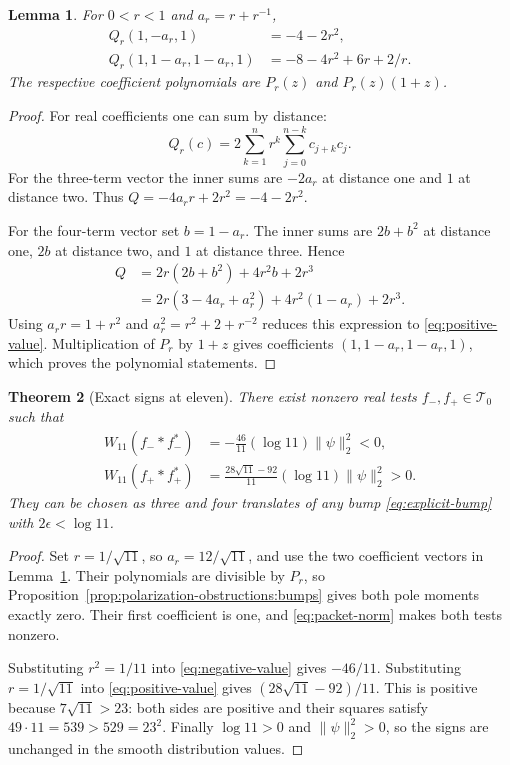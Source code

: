 \documentclass[11pt,letterpaper]{article}
\newtheorem{theorem}{Theorem}[section]
\newtheorem{lemma}[theorem]{Lemma}
\theoremstyle{definition}
\theoremstyle{remark}
\newcommand{\T}{\mathcal T}
\begin{document}
\begin{lemma}
\label{lem:short-values}
For $0<r<1$ and $a_r=r+r^{-1}$,
\begin{align}
 Q_r(1,-a_r,1)&=-4-2r^2,
 \label{eq:negative-value}\\
 Q_r(1,1-a_r,1-a_r,1)&=-8-4r^2+6r+2/r.
 \label{eq:positive-value}
\end{align}
The respective coefficient polynomials are $P_r(z)$ and
$P_r(z)(1+z)$.
\end{lemma}
\begin{proof}
For real coefficients one can sum by distance:
\[
 Q_r(c)=2\sum_{k=1}^nr^k\sum_{j=0}^{n-k}c_{j+k}c_j.
\]
For the three-term vector the inner sums are $-2a_r$ at
distance one and $1$ at distance two. Thus
$Q=-4a_rr+2r^2=-4-2r^2$.

For the four-term vector set $b=1-a_r$. The inner sums are
$2b+b^2$ at distance one, $2b$ at distance two, and $1$ at
distance three. Hence
\begin{align*}
 Q&=2r(2b+b^2)+4r^2b+2r^3\\
  &=2r(3-4a_r+a_r^2)+4r^2(1-a_r)+2r^3.
\end{align*}
Using $a_rr=1+r^2$ and
$a_r^2=r^2+2+r^{-2}$ reduces this expression to
\eqref{eq:positive-value}. Multiplication of $P_r$ by
$1+z$ gives coefficients $(1,1-a_r,1-a_r,1)$, which proves
the polynomial statements.
\end{proof}

\begin{theorem}[Exact signs at eleven]
\label{thm:polarization-obstructions:signs}
There exist nonzero real tests $f_-,f_+\in\T_0$ such that
\begin{align}
 W_{11}(f_-*f_-^*)&=-\frac{46}{11}(\log11)\|\psi\|_2^2<0,
 \label{eq:eleven-minus}\\
 W_{11}(f_+*f_+^*)&=\frac{28\sqrt{11}-92}{11}
 (\log11)\|\psi\|_2^2>0.
 \label{eq:eleven-plus}
\end{align}
They can be chosen as three and four translates of any bump
\eqref{eq:explicit-bump} with $2\epsilon<\log11$.
\end{theorem}
\begin{proof}
Set $r=1/\sqrt{11}$, so $a_r=12/\sqrt{11}$, and use the
two coefficient vectors in Lemma~\ref{lem:short-values}.
Their polynomials are divisible by $P_r$, so
Proposition~\ref{prop:polarization-obstructions:bumps} gives
both pole moments exactly zero. Their first coefficient is
one, and \eqref{eq:packet-norm} makes both tests nonzero.

Substituting $r^2=1/11$ into
\eqref{eq:negative-value} gives $-46/11$. Substituting
$r=1/\sqrt{11}$ into \eqref{eq:positive-value} gives
$(28\sqrt{11}-92)/11$. This is positive because
$7\sqrt{11}>23$: both sides are positive and their squares
satisfy $49\cdot11=539>529=23^2$.
Finally $\log11>0$ and $\|\psi\|_2^2>0$, so the signs
are unchanged in the smooth distribution values.
\end{proof}
\end{document}
